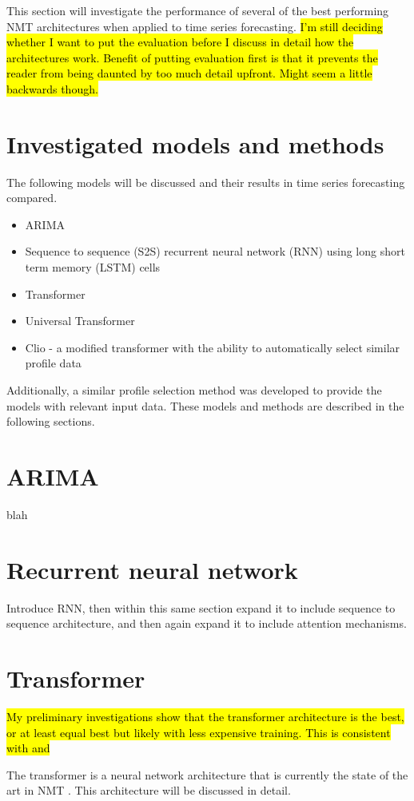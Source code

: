 \par
This section will investigate the performance of several of the best performing NMT architectures when applied to time series forecasting.
\hl{I'm still deciding whether I want to put the evaluation before I discuss in detail how the architectures work.
	Benefit of putting evaluation first is that it prevents the reader from being daunted by too much detail upfront.
	Might seem a little backwards though.}

\section{Investigated models and methods}
The following models will be discussed and their results in time series forecasting compared.
\begin{itemize}
	\item ARIMA
	\item Sequence to sequence (S2S) recurrent neural network (RNN) \citep{Cho2014a} using long short term memory (LSTM) \citep{hochreiter1997long} cells
	\item Transformer \citep{Vaswani2017}
	\item Universal Transformer \cite{Dehghani2018}
	\item Clio - a modified transformer with the ability to automatically select similar profile data
\end{itemize}

Additionally, a similar profile selection method was developed to provide the models with relevant input data.
These models and methods are described in the following sections.

\section{ARIMA}
blah

\section{Recurrent neural network}
Introduce RNN, then within this same section expand it to include sequence to sequence architecture, and then again expand it to include attention mechanisms.

\section{Transformer}
\hl{My preliminary investigations show that the transformer architecture is the best, or at least equal best but likely with less expensive training. This is consistent with \protect\cite{Song2017} and \protect\cite{Vaswani2017}}\\
\par
The transformer is a neural network architecture that is currently the state of the art in NMT \citep{Vaswani2017}.
This architecture will be discussed in detail. 

